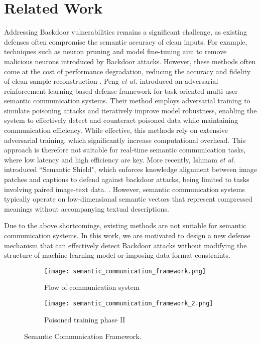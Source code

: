 \section{Related Work}
\label{related work}
Addressing Backdoor vulnerabilities remains a significant challenge, as existing defenses often compromise the semantic accuracy of clean inputs. For example, techniques such as neuron pruning and model fine-tuning aim to remove malicious neurons introduced by Backdoor attacks. However, these methods often come at the cost of performance degradation, reducing the accuracy and fidelity of clean sample reconstruction \cite{10622193}. Peng \emph{et at.} introduced an adversarial reinforcement learning-based defense framework for task-oriented multi-user semantic communication systems. Their method employs adversarial training to simulate poisoning attacks and iteratively improve model robustness, enabling the system to effectively detect and counteract poisoned data while maintaining communication efficiency\cite{10643310}. While effective, this methods rely on extensive adversarial training, which significantly increase computational overhead. This approach is therefore not suitable for real-time semantic communication tasks, where low latency and high efficiency are key. More recently, Ishmam  \emph{et al.} introduced ``Semantic Shield", which enforces knowledge alignment between image patches and captions to defend against backdoor attacks, being limited to tasks involving paired image-text data. \cite{10655192}. However, semantic communication systems typically operate on low-dimensional semantic vectors that represent compressed meanings without accompanying textual descriptions. 

Due to the above shortcomings, existing methods are not suitable for semantic communication systems. In this work, we are motivated to design a new defense mechanism that can effectively detect Backdoor attacks without modifying the structure of machine learning model or imposing data format constraints. 

\begin{figure}[htbp]
\centering
\begin{subfigure}[b]{\linewidth}
\centering
\texttt{[image: semantic\_communication\_framework.png]}
\caption{Flow of communication system}
\end{subfigure}

\begin{subfigure}[b]{\linewidth}
\centering
\texttt{[image: semantic\_communication\_framework\_2.png]}
\caption{Poisoned training phase II}
\end{subfigure}
\caption{Semantic Communication Framework.}
\label{framework 1}

\end{figure}